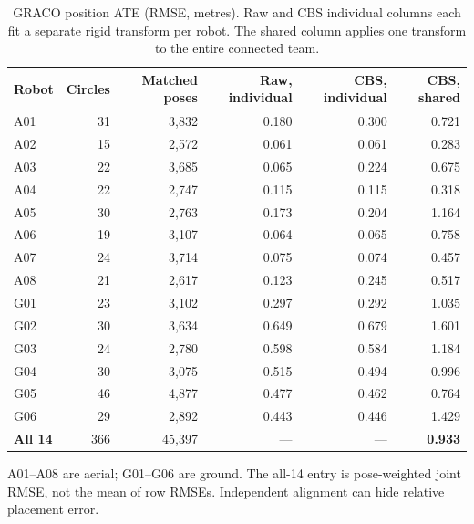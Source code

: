 \begin{table}[htbp]
\centering\small
\caption{GRACO position ATE (RMSE, metres). Raw and CBS individual columns each fit a separate rigid transform per robot. The shared column applies one transform to the entire connected team.}
\label{tab:robot-accuracy}
\begin{tabular}{lrrrrr}
\toprule
Robot & Circles & Matched poses & Raw, individual & CBS, individual & CBS, shared \\
\midrule
A01 & 31 & 3,832 & 0.180 & 0.300 & 0.721 \\
A02 & 15 & 2,572 & 0.061 & 0.061 & 0.283 \\
A03 & 22 & 3,685 & 0.065 & 0.224 & 0.675 \\
A04 & 22 & 2,747 & 0.115 & 0.115 & 0.318 \\
A05 & 30 & 2,763 & 0.173 & 0.204 & 1.164 \\
A06 & 19 & 3,107 & 0.064 & 0.065 & 0.758 \\
A07 & 24 & 3,714 & 0.075 & 0.074 & 0.457 \\
A08 & 21 & 2,617 & 0.123 & 0.245 & 0.517 \\
G01 & 23 & 3,102 & 0.297 & 0.292 & 1.035 \\
G02 & 30 & 3,634 & 0.649 & 0.679 & 1.601 \\
G03 & 24 & 2,780 & 0.598 & 0.584 & 1.184 \\
G04 & 30 & 3,075 & 0.515 & 0.494 & 0.996 \\
G05 & 46 & 4,877 & 0.477 & 0.462 & 0.764 \\
G06 & 29 & 2,892 & 0.443 & 0.446 & 1.429 \\
\textbf{All 14} & 366 & 45,397 & --- & --- & \textbf{0.933} \\
\bottomrule
\end{tabular}
\par\vspace{5pt}\begin{minipage}{0.97\linewidth}\footnotesize A01--A08 are aerial; G01--G06 are ground. The all-14 entry is pose-weighted joint RMSE, not the mean of row RMSEs. Independent alignment can hide relative placement error.\end{minipage}
\end{table}
